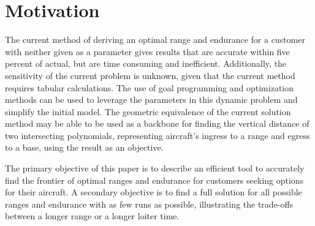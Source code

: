 \section{Motivation}
\hspace{.5cm}The current method of deriving an optimal range and endurance for a customer with neither given as a parameter gives results that are accurate within five percent of actual, but are time consuming and inefficient. Additionally, the sensitivity of the current problem is unknown, given that the current method requires tabular calculations. The use of goal programming and optimization methods can be used to leverage the parameters in this dynamic problem and simplify the initial model. The geometric equivalence of the current solution method may be able to be used as a backbone for finding the vertical distance of two intersecting polynomials, representing aircraft's ingress to a range and egress to a base, using the result as an objective.\par
The primary objective of this paper is to describe an efficient tool to accurately find the frontier of optimal ranges and endurance for customers seeking options for their aircraft. A secondary objective is to find a full solution for all possible ranges and endurance with as few runs as possible, illustrating the trade-offs between a longer range or a longer loiter time. \par

